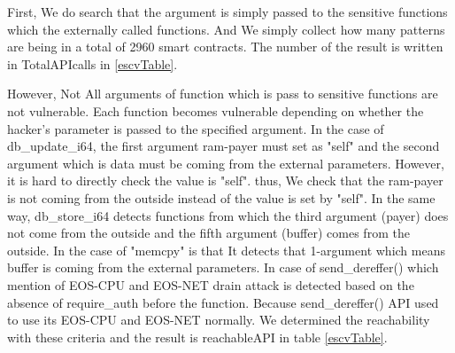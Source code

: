 
First, We do search that the argument is simply passed to the sensitive functions which the externally called functions. And We simply collect how many patterns are being in a total of 2960 smart contracts. The number of the result is written in TotalAPIcalls in \autoref{escvTable}.

However, Not All arguments of function which is pass to sensitive functions are not vulnerable. Each function becomes vulnerable depending on whether the hacker's parameter is passed to the specified argument. In the case of db\_update\_i64, the first argument ram-payer must set as "self" and the second argument which is data must be coming from the external parameters. However, it is hard to directly check the value is "self". thus, We check that the ram-payer is not coming from the outside instead of the value is set by "self".
In the same way, db\_store\_i64 detects functions from which the third argument (payer) does not come from the outside and the fifth argument (buffer) comes from the outside.
In the case of "memcpy" is that It detects that 1-argument which means buffer is coming from the external parameters.
In case of send\_dereffer() which mention of EOS-CPU and EOS-NET drain attack is detected based on the absence of require\_auth before the function. Because send\_dereffer() API used to use its EOS-CPU and EOS-NET normally.
We determined the reachability with these criteria and the result is reachableAPI in table \autoref{escvTable}.




